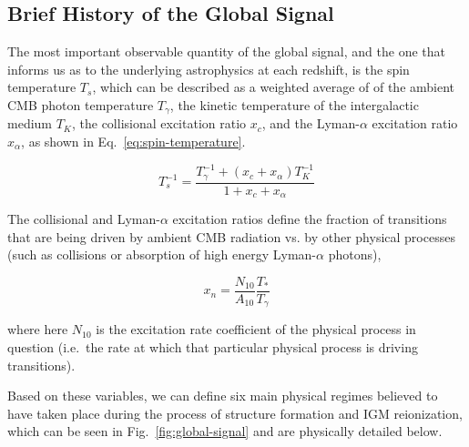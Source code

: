 \subsection{Brief History of the Global Signal}

The most important observable quantity of the global signal, and the one that 
informs us as to the underlying astrophysics at each redshift, is the spin 
temperature $T_s$, which can be described as a weighted average of of the 
ambient CMB photon temperature $T_\gamma$, the kinetic temperature of the 
intergalactic medium $T_K$, the collisional excitation ratio $x_c$, and the 
Lyman-$\alpha$ excitation ratio $x_\alpha$, as shown in 
Eq.~\eqref{eq:spin-temperature}.

\begin{equation}
    T_s^{-1} = \frac{T_\gamma^{-1} + (x_c + x_\alpha) T_K^{-1}}{1 + x_c + 
    x_\alpha}
    \label{eq:spin-temperature}
\end{equation}

The collisional and Lyman-$\alpha$ excitation ratios define the fraction of 
transitions that are being driven by ambient CMB radiation vs. by other 
physical processes (such as collisions or absorption of high energy 
Lyman-$\alpha$ photons),

\begin{equation}
    x_n = \frac{N_{10}}{A_{10}}\frac{T_*}{T_\gamma}
    \label{eq:excitation-ratio}
\end{equation}

where here $N_{10}$ is the excitation rate coefficient of the physical process 
in question (i.e.~the rate at which that particular physical process is driving 
transitions).

Based on these variables, we can define six main physical regimes believed to 
have taken place during the process of structure formation and IGM 
reionization, which can be seen in Fig.~\ref{fig:global-signal} and are 
physically detailed below.

